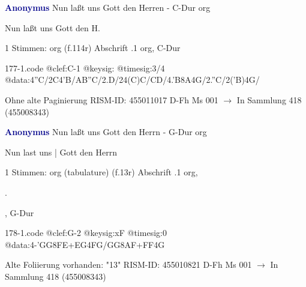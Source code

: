 \documentclass[twocolumn]{book}
\begin{document}
\newline \par \vspace{7pt} \textcolor{darkblue}{\textbf{Anonymus  }}
\newline Nun laßt uns Gott den Herren - C-Dur
\newline org
\newline \begin{itshape}[f.114r, heading:] Nun laßt uns Gott den H.\end{itshape} 
\newline \textcolor{darkblue}{}  1 Stimmen: org  (f.114r)
\newline Abschrift
.1  org, C-Dur  
\begin{filecontents*}{177-1.code}
@clef:C-1
@keysig:
@timesig:3/4
@data:4''C/2C4'B/AB''C/2.D/24(C)C/CD/4.'B8A4G/2.''C/2('B)4G/
\end{filecontents*}
\newline
%
\newline Ohne alte Paginierung
\newline RISM-ID: 455011017
\newline D-Fh  Ms 001
\newline $\rightarrow$ In Sammlung 418 (455008343)
      
\newline \par \vspace{7pt} \textcolor{darkblue}{\textbf{Anonymus  }}
\newline Nun laßt uns Gott den Herrn - G-Dur
\newline org
\newline \begin{itshape}[f.13r, at left:] Nun last uns | Gott den Herrn\end{itshape} 
\newline \textcolor{darkblue}{}  1 Stimmen: org (tabulature)  (f.13r)
\newline Abschrift
.1  org, \begin{itshape}.\end{itshape}, G-Dur  
\begin{filecontents*}{178-1.code}
@clef:G-2
@keysig:xF
@timesig:0
@data:4-'GG{8FE+}{EG}4FG/GG{8AF+}{FF}4G
\end{filecontents*}
\newline
%
\newline Alte Foliierung vorhanden: "13"
\newline RISM-ID: 455010821
\newline D-Fh  Ms 001
\newline $\rightarrow$ In Sammlung 418 (455008343)
      
\end{document}
